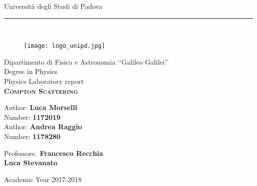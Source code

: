 \begin{titlepage}
	
	\begin{center}
		\LARGE{Università degli Studi di Padova}\\
		\noindent\rule{12cm}{0.4pt}\\
		\begin{figure}[H]
			\centering
			\texttt{[image: logo\_unipd.jpg]}
		\end{figure}
		\vspace{-0.2em}
		\Large{Dipartimento di Fisica e Astronomia ‘‘Galileo Galilei’’}\\
		\vspace{2em}
		\Large{Degree in Physics}\\
		\vspace{2em}
		\normalsize{Physics Laboratory report}\\
		\vspace{3.5em}
		\LARGE{\textsc{\textbf{Compton Scattering}}}\\
		\vspace{3em}
		\begin{flushleft}
			\Large{Author: \textbf{Luca Morselli}}\\
			\Large{Number: \textbf{1172019}}\\
			\vspace{0.5em}
			\Large{Author: \textbf{Andrea Raggio}}\\
			\Large{Number: \textbf{1178280}}
		\end{flushleft}
		\vspace{2em}
	\end{center}
	\begin{flushright}
		\normalsize{Professors:~\textbf{Francesco Recchia\\Luca Stevanato\\}}
	\end{flushright}
	\begin{center}
		\vspace{2.5em}
		\LARGE{Academic Year 2017-2018}\\
	\end{center}
	
\end{titlepage}